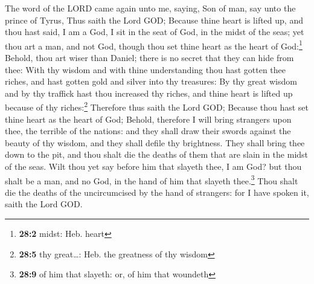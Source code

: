  The word of the LORD came again unto me, saying,
 Son of man, say unto the prince of Tyrus, Thus saith the
Lord GOD; Because thine heart is lifted up, and thou hast said, I am a
God, I sit in the seat of God, in the midst of the seas; yet thou art a
man, and not God, though thou set thine heart as the heart of
God:\footnote{\textbf{28:2} midst: Heb. heart}  Behold,
thou art wiser than Daniel; there is no secret that they can hide from
thee:  With thy wisdom and with thine understanding thou
hast gotten thee riches, and hast gotten gold and silver into thy
treasures:  By thy great wisdom and by thy traffick hast
thou increased thy riches, and thine heart is lifted up because of thy
riches:\footnote{\textbf{28:5} thy great\ldots: Heb. the greatness of
  thy wisdom}  Therefore thus saith the Lord GOD; Because
thou hast set thine heart as the heart of God;  Behold,
therefore I will bring strangers upon thee, the terrible of the nations:
and they shall draw their swords against the beauty of thy wisdom, and
they shall defile thy brightness.  They shall bring thee
down to the pit, and thou shalt die the deaths of them that are slain in
the midst of the seas.  Wilt thou yet say before him that
slayeth thee, I am God? but thou shalt be a man, and no God, in the hand
of him that slayeth thee.\footnote{\textbf{28:9} of him that slayeth:
  or, of him that woundeth}  Thou shalt die the deaths of
the uncircumcised by the hand of strangers: for I have spoken it, saith
the Lord GOD.

